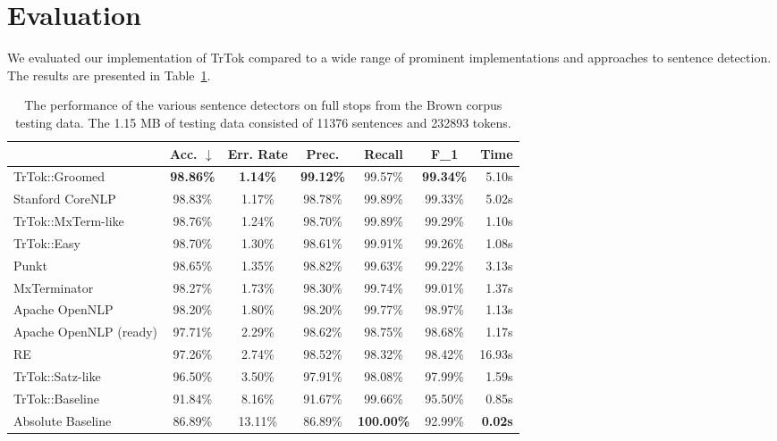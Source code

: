 \section{Evaluation}
\label{sec:eval}

We evaluated our implementation of TrTok compared to a wide range of
prominent implementations and approaches to sentence detection. The
results are presented in Table~\ref{tbl:grand-melee}.

\begin{table}
  \small
  \begin{center}
    \begin{tabular}{ | l | c | c | c | c | c | r | }
      \hline
      & Acc. $\downarrow$ & Err. Rate & Prec.
      & Recall & F_1 & Time \\ \hline
      TrTok::Groomed & \textbf{98.86\%} & \textbf{1.14\%} & \textbf{99.12\%}
                     & 99.57\% & \textbf{99.34\%} & 5.10s \\ \hline
      Stanford CoreNLP & 98.83\% & 1.17\% & 98.78\%
                       & 99.89\% & 99.33\% & 5.02s \\ \hline
      TrTok::MxTerm-like & 98.76\% & 1.24\% & 98.70\%
                         & 99.89\% & 99.29\% & 1.10s \\ \hline
      TrTok::Easy & 98.70\% & 1.30\% & 98.61\%
                  & 99.91\% & 99.26\% & 1.08s \\ \hline
      Punkt & 98.65\% & 1.35\% & 98.82\%
            & 99.63\% & 99.22\% & 3.13s \\ \hline
      MxTerminator & 98.27\% & 1.73\% & 98.30\%
                   & 99.74\% & 99.01\% & 1.37s \\ \hline
      Apache OpenNLP & 98.20\% & 1.80\% & 98.20\%
                     & 99.77\% & 98.97\% & 1.13s \\ \hline
      Apache OpenNLP (ready) & 97.71\% & 2.29\% & 98.62\%
                             & 98.75\% & 98.68\% & 1.17s \\ \hline
      RE & 97.26\% & 2.74\% & 98.52\%
         & 98.32\% & 98.42\% & 16.93s \\ \hline
      TrTok::Satz-like & 96.50\% & 3.50\% & 97.91\%
                       & 98.08\% & 97.99\% & 1.59s \\ \hline
      TrTok::Baseline & 91.84\% & 8.16\% & 91.67\%
                      & 99.66\% & 95.50\% & 0.85s \\ \hline
      Absolute Baseline & 86.89\% & 13.11\% & 86.89\%
                        & \textbf{100.00\%} & 92.99\% & \textbf{0.02s} \\ \hline
    \end{tabular}
  \end{center}
  \caption[Performance of sentence detectors on the Brown corpus] {The
    performance of the various sentence detectors on full stops from
    the Brown corpus testing data. The 1.15 MB of testing data
    consisted of 11376 sentences and 232893 tokens.}
  \label{tbl:grand-melee}
\end{table}

